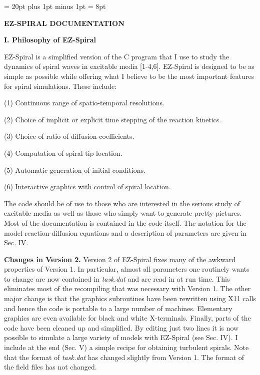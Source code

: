 \documentclass[12pt]{article}
\begin{document}
\baselineskip = 20pt plus 1pt minus 1pt
\parskip = 8pt
\parindent=0pt

\begin{center} 
{\bf EZ-SPIRAL DOCUMENTATION} 
\end{center} 

\bigskip
{\bf I. Philosophy of EZ-Spiral} 
\smallskip

EZ-Spiral is a simplified version of the C program that I use to study the
dynamics of spiral waves in excitable media [1-4,6]. EZ-Spiral is designed to
be as simple as possible while offering what I believe to be the most
important features for spiral simulations. These include:
\begin{list}{dummy}
{\partopsep=-10pt\parsep=-10pt\itemsep=12pt}
\item[(1)] Continuous range of spatio-temporal resolutions.
\item[(2)] Choice of implicit or explicit time stepping of the reaction 
           kinetics. 
\item[(3)] Choice of ratio of diffusion coefficients.
\item[(4)] Computation of spiral-tip location.
\item[(5)] Automatic generation of initial conditions.
\item[(6)] Interactive graphics with control of spiral location.
\end{list}

The code should be of use to those who are interested in the serious
study of excitable media as well as those who simply want to generate
pretty pictures. Most of the documentation is contained in the code
itself. The notation for the model reaction-diffusion equations and a
description of parameters are given in Sec. IV.

{\bf Changes in Version 2.}  Version 2 of EZ-Spiral fixes many of the
awkward properties of Version 1.  In particular, almost all parameters
one routinely wants to change are now contained in {\em task.dat} and
are read in at run time.  This eliminates most of the recompiling that
was necessary with Version 1.  The other major change is that the
graphics subroutines have been rewritten using X11 calls and hence the
code is portable to a large number of machines.  Elementary graphics
are even available for black and white X-terminals.  Finally, parts of
the code have been cleaned up and simplified.  By editing just two
lines it is now possible to simulate a large variety of models with
EZ-Spiral (see Sec. IV).  I include at the end (Sec. V) a simple
recipe for obtaining turbulent spirals.  Note that the format of {\em
task.dat} has changed slightly from Version 1.  The format of the
field files has not changed.
\end{document}
